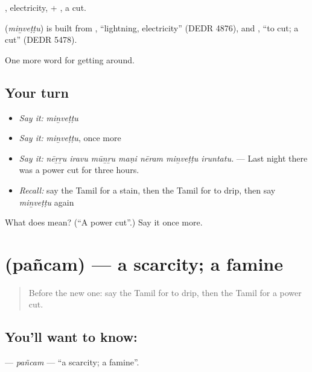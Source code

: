 , electricity, + , a cut.

\begin{cousinweb}
\textbf{} (\emph{miṉveṭṭu}) is built from , \textquotedblleft{}lightning, electricity\textquotedblright{} (DEDR 4876), and , \textquotedblleft{}to cut; a cut\textquotedblright{} (DEDR 5478).
\end{cousinweb}

\begin{grammarlens}[title={What you've built}]
One more word for getting around.
\end{grammarlens}

\subsection*{Your turn}
\begin{itemize}
\raggedright
  \item \emph{Say it:} \emph{miṉveṭṭu}
  \item \emph{Say it:} \emph{miṉveṭṭu}, once more
  \item \emph{Say it:} \emph{nēṟṟu iravu mūṉṟu maṇi nēram miṉveṭṭu iruntatu.} — Last night there was a power cut for three hours.
  \item \emph{Recall:} say the Tamil for a stain, then the Tamil for to drip, then say \emph{miṉveṭṭu} again
\end{itemize}

\begin{tcolorbox}[breakable,colback=teal!4,colframe=teal!35!black,title={Before you move on}]
What does  mean? (\textquotedblleft{}A power cut\textquotedblright{}.) Say it once more.
\end{tcolorbox}
\section[\texorpdfstring{\ta{பஞ்சம்} (pañcam)}{பஞ்சம் (pañcam)}]{ (pañcam) — a scarcity; a famine}

\label{lesson:TA-C445-pancam}



\begin{quote}
Before the new one: say the Tamil for to drip, then the Tamil for a power cut.
\end{quote}

\subsection*{You'll want to know: }
\textbf{} — \emph{pañcam} — \textquotedblleft{}a scarcity; a famine\textquotedblright{}.

